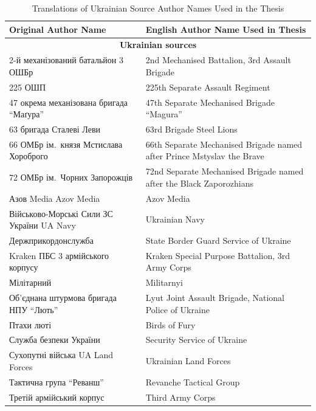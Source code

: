 \begin{table}[H]
	\centering
	\small
	\begin{tabular}{p{} p{}}
		\toprule
		Original Author Name & English Author Name Used in Thesis \\
		\midrule
		\multicolumn{2}{c}{\textbf{Ukrainian sources}} \\
		\midrule
		2-й механізований батальйон 3 ОШБр & 2nd Mechanised Battalion, 3rd Assault Brigade \\
		225 ОШП & 225th Separate Assault Regiment \\
		47 окрема механізована бригада ``Маґура'' & 47th Separate Mechanised Brigade ``Magura'' \\
		63 бригада \textbar{} Сталеві Леви & 63rd Brigade \textbar{} Steel Lions \\
		66 ОМБр ім.\ князя Мстислава Хороброго & 66th Separate Mechanised Brigade named after Prince Mstyslav the Brave \\
		72 ОМБр ім.\ Чорних Запорожців & 72nd Separate Mechanised Brigade named after the Black Zaporozhians \\
		Азов Media \textbar{} Azov Media & Azov Media \\
		Військово-Морські Сили ЗС України \textbar{} UA Navy & Ukrainian Navy \\
		Держприкордонслужба & State Border Guard Service of Ukraine \\
		Kraken \textbar{} ПБС 3 армійського корпусу & Kraken \textbar{} Special Purpose Battalion, 3rd Army Corps \\
		Мілітарний & Militarnyi \\
		Об'єднана штурмова бригада НПУ ``Лють'' & Lyut Joint Assault Brigade, National Police of Ukraine \\
		Птахи люті & Birds of Fury \\
		Служба безпеки України & Security Service of Ukraine \\
		Сухопутні війська \textbar{} UA Land Forces & Ukrainian Land Forces \\
		Тактична група ``Реванш'' & Revanche Tactical Group \\
		Третій армійський корпус & Third Army Corps \\
		\bottomrule
	\end{tabular}
	\caption[Translations of Ukrainian Source Author Names]{Translations of Ukrainian Source Author Names Used in the Thesis}
	\label{tab:ukrainian-source-name-translations}
\end{table}

